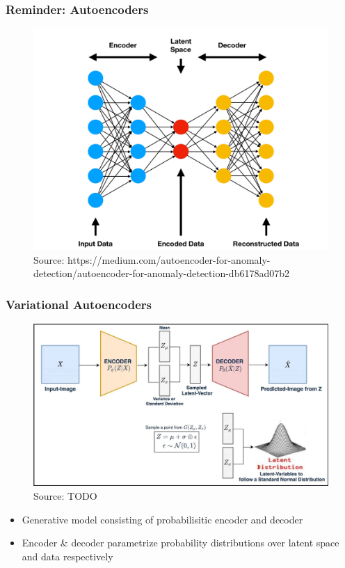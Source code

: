 \documentclass{beamer}
\theoremstyle{definition}
\begin{document}
    \begin{frame}
      \frametitle{Reminder: Autoencoders}
      \begin{figure}
        \includegraphics[scale= 0.09]{Autoencoder_illustration.png}
        \caption*{Source: https://medium.com/autoencoder-for-anomaly-detection/autoencoder-for-anomaly-detection-db6178ad07b2}
      \end{figure}
    \end{frame}
    \begin{frame}
      \frametitle{Variational Autoencoders}
      \begin{figure}
        \includegraphics[scale=.125]{vae-diagram.jpg}
        \caption{Source: TODO}
      \end{figure}
      \vspace{-5mm}
      \begin{itemize}
        \item Generative model consisting of probabilisitic encoder and decoder
        \item Encoder \& decoder parametrize probability distributions over latent space and data respectively
      \end{itemize}
    \end{frame}
\end{document}

